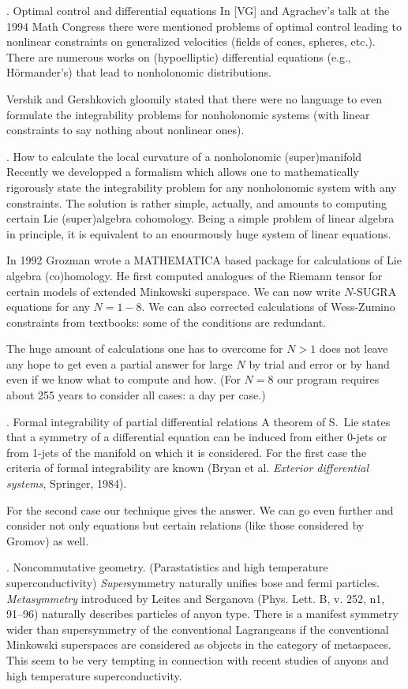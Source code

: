 . Optimal control and differential equations\endsubhead
In [VG] and Agrachev's talk at the 1994 Math Congress there were mentioned
problems
of optimal control leading to nonlinear constraints  on generalized
velocities (fields
of cones, spheres, etc.). There are numerous works on (hypoelliptic)
differential equations
(e.g., H\"ormander's) that lead to nonholonomic distributions.

Vershik and Gershkovich gloomily stated that there were no language 
to even formulate the integrability problems for nonholonomic systems 
(with linear constraints to say nothing about nonlinear ones).
	
. How to calculate the local curvature of a nonholonomic
(super)manifold\endsubhead 
Recently we developped a formalism which allows one to 
mathematically rigorously state the integrability problem for any 
nonholonomic system with any constraints. The solution is rather simple,
actually, and
amounts to computing certain Lie (super)algebra cohomology. Being a simple
problem of linear algebra in principle, it is equivalent to an enourmously huge
system of linear  equations. 

In 1992 Grozman wrote a MATHEMATICA based package for calculations of Lie
algebra
(co)homology. He first computed analogues of the Riemann tensor for certain
models of
extended Minkowski superspace. We can now write $N$-SUGRA equations for any
$N=1 - 8$. We
can also corrected calculations of Wess-Zumino constraints from textbooks:
some of the
conditions are redundant.

The huge amount of calculations one has to overcome for $N>1$ does not 
leave any hope to get even a partial answer for large $N$ by trial and
error or by hand
even if we know what to compute and how. (For $N=8$ our program requires
about 255 years to
consider all cases: a day per case.) 


. Formal integrability of partial differential relations\endsubhead
A theorem of S.~Lie states that a symmetry of a differential equation can
be induced from
either 0-jets or from 1-jets of the manifold on which it is considered. For the
first case the criteria of formal integrability are known (Bryan et al.
{\it Exterior
differential systems}, Springer, 1984). 

For the second case our technique gives the answer. We can go even further
and consider not
only equations but certain relations (like those considered by Gromov) as well.

. Noncommutative geometry. (Parastatistics and high temperature
superconductivity)\endsubhead
{\it Super}\-sym\-metry naturally unifies bose and fermi particles. {\it
Metasymmetry}
introduced by Leites and Serganova (Phys. Lett. B, v. 252, n1, 91--96)
naturally describes
particles of anyon type. There is a manifest symmetry wider than
supersymmetry of the 
conventional Lagrangeans if the conventional Minkowski superspaces are
considered as objects
in the category of metaspaces. This seem to be very tempting in connection
with recent
studies of anyons and high temperature superconductivity.
 	
